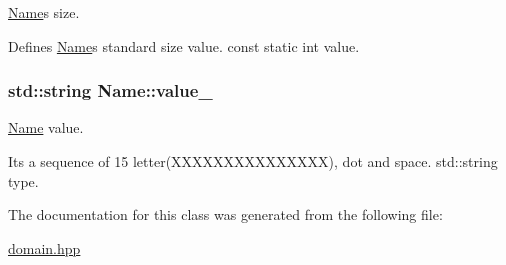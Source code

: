 \hyperlink{className}{Name}\textquotesingle{}s size. 

Defines \hyperlink{className}{Name}\textquotesingle{}s standard size value. const static int value. 
\subsubsection[{\texorpdfstring{value\+\_\+}{value_}}]{\setlength{\rightskip}{0pt plus 5cm}std\+::string Name\+::value\+\_\+\hspace{0.3cm}{\ttfamily [private]}}\hypertarget{className_a8860474fd3003c3187aa4f5ff3dc4b89}{}\label{className_a8860474fd3003c3187aa4f5ff3dc4b89}


\hyperlink{className}{Name} value. 

It\textquotesingle{}s a sequence of 15 letter(\+X\+X\+X\+X\+X\+X\+X\+X\+X\+X\+X\+X\+X\+X\+X), dot and space. std\+::string type. 

The documentation for this class was generated from the following file\+:\begin{DoxyCompactItemize}
\item 
\hyperlink{domain_8hpp}{domain.\+hpp}\end{DoxyCompactItemize}

